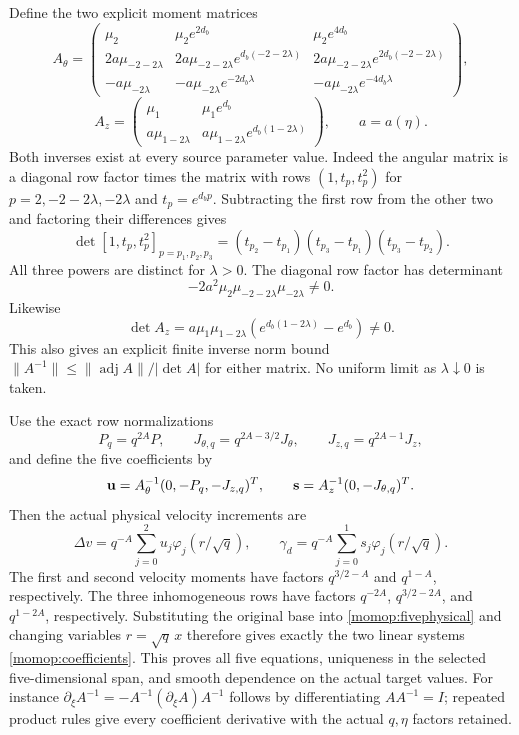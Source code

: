Define the two explicit moment matrices
\[
 A_\theta=
 \begin{pmatrix}
 \mu_2&\mu_2e^{2d_b}&\mu_2e^{4d_b}\\
 2a\mu_{-2-2\lambda}&
 2a\mu_{-2-2\lambda}e^{d_b(-2-2\lambda)}&
 2a\mu_{-2-2\lambda}e^{2d_b(-2-2\lambda)}\\
 -a\mu_{-2\lambda}&-a\mu_{-2\lambda}e^{-2d_b\lambda}&
                              -a\mu_{-2\lambda}e^{-4d_b\lambda}
 \end{pmatrix},
\]
\[
 A_z=
 \begin{pmatrix}
 \mu_1&\mu_1e^{d_b}\\
 a\mu_{1-2\lambda}&a\mu_{1-2\lambda}e^{d_b(1-2\lambda)}
 \end{pmatrix},\qquad a=a(\eta).
\]
Both inverses exist at every source parameter value. Indeed the
angular matrix is a diagonal row factor times the matrix with rows
$(1,t_p,t_p^2)$ for $p=2,-2-2\lambda,-2\lambda$ and
$t_p=e^{d_bp}$. Subtracting the first row from the other two
and factoring their differences gives
\[
 \det[1,t_p,t_p^2]_{p=p_1,p_2,p_3}
 =(t_{p_2}-t_{p_1})(t_{p_3}-t_{p_1})(t_{p_3}-t_{p_2}).
\]
All three powers are distinct for $\lambda>0$. The diagonal
row factor has determinant
\[
-2a^2\mu_2\mu_{-2-2\lambda}\mu_{-2\lambda}\ne0.
\]
Likewise
\[
\det A_z=a\mu_1\mu_{1-2\lambda}
(e^{d_b(1-2\lambda)}-e^{d_b})\ne0.
\]
This also gives an explicit finite inverse norm bound
$\|A^{-1}\|\le\|\operatorname{adj}A\|/|\det A|$
for either matrix. No uniform limit as $\lambda\downarrow0$ is taken.

Use the exact row normalizations
\[
 P_q=q^{2A}P,\qquad
 J_{\theta,q}=q^{2A-3/2}J_\theta,\qquad
 J_{z,q}=q^{2A-1}J_z,
\]
and define the five coefficients by
\begin{equation}\label{momop:coefficients}
 {\bf u}=A_\theta^{-1}(0,-P_q,-J_{z,q})^T,\qquad
 {\bf s}=A_z^{-1}(0,-J_{\theta,q})^T .
\end{equation}
Then the actual physical velocity increments are
\begin{equation}\label{momop:fiveincrement}
 \Delta v=q^{-A}\sum_{j=0}^2u_j\varphi_j(r/\sqrt q),
 \qquad
 \gamma_d=q^{-A}\sum_{j=0}^1s_j\varphi_j(r/\sqrt q).
\end{equation}
The first and second velocity moments have factors $q^{3/2-A}$
and $q^{1-A}$, respectively. The three inhomogeneous rows have
factors $q^{-2A}$, $q^{3/2-2A}$, and $q^{1-2A}$, respectively.
Substituting the original base into \eqref{momop:fivephysical}
and changing variables $r=\sqrt q\,x$ therefore gives exactly
the two linear systems \eqref{momop:coefficients}. This proves all
five equations, uniqueness in the selected five-dimensional span,
and smooth dependence on the actual target values. For instance
$\partial_\xi A^{-1}=-A^{-1}(\partial_\xi A)A^{-1}$ follows by
differentiating $AA^{-1}=I$; repeated product rules give every
coefficient derivative with the actual $q,\eta$ factors retained.

